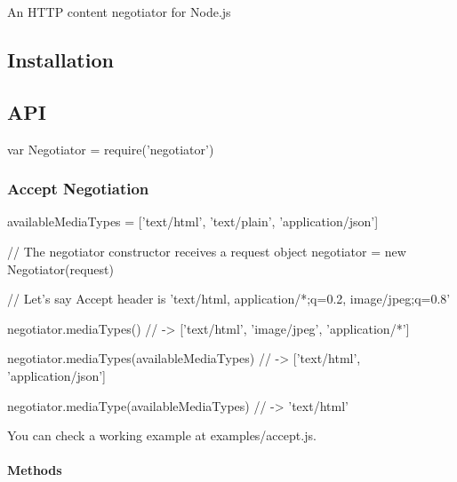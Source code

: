 \href{https://npmjs.org/package/negotiator}{\tt } \href{https://npmjs.org/package/negotiator}{\tt } \href{https://nodejs.org/en/download/}{\tt } \href{https://travis-ci.org/jshttp/negotiator}{\tt } \href{https://coveralls.io/r/jshttp/negotiator?branch=master}{\tt }

An H\+T\+TP content negotiator for Node.\+js

\subsection*{Installation}




\subsection*{A\+PI}


\begin{DoxyCode}
var Negotiator = require('negotiator')
\end{DoxyCode}


\subsubsection*{Accept Negotiation}


\begin{DoxyCode}
availableMediaTypes = ['text/html', 'text/plain', 'application/json']

// The negotiator constructor receives a request object
negotiator = new Negotiator(request)

// Let's say Accept header is 'text/html, application/*;q=0.2, image/jpeg;q=0.8'

negotiator.mediaTypes()
// -> ['text/html', 'image/jpeg', 'application/*']

negotiator.mediaTypes(availableMediaTypes)
// -> ['text/html', 'application/json']

negotiator.mediaType(availableMediaTypes)
// -> 'text/html'
\end{DoxyCode}


You can check a working example at {\ttfamily examples/accept.\+js}.

\paragraph*{Methods}

